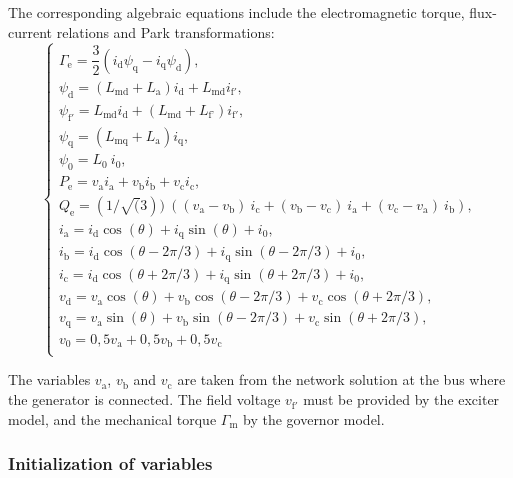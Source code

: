The corresponding algebraic equations include the electromagnetic torque, flux-current relations and Park transformations:
\begin{equation}
\begin{cases}
\Gamma_\text{e} = \dfrac{3}{2} (i_\text{d} \psi_\text{q} - i_\text{q} \psi_\text{d}), \\[6pt]
\psi_\text{d} = (L_{\text{md}} + L_\text{a}) i_\text{d} + L_{\text{md}} i_{\text{f}'}, \\[6pt]
\psi_{\text{f}'} = L_{\text{md}} i_\text{d} + (L_{\text{md}} + L_\text{f'}) i_{\text{f}'}, \\[6pt]
\psi_\text{q} = (L_{\text{mq}} + L_\text{a}) i_\text{q}, \\[6pt]
\psi_\text{0} = L_\text{0}~i_\text{0}, \\[6pt]
P_\text{e} = v_\text{a} i_\text{a} + v_\text{b} i_\text{b} + v_\text{c} i_\text{c}, \\[6pt]
Q_\text{e} = (1 / \sqrt(3))~ ((v_\text{a} - v_\text{b})~ i_\text{c} + (v_\text{b} - v_\text{c})~ i_\text{a} + (v_\text{c} - v_\text{a})~ i_\text{b}),\\[6pt]
i_\text{a} = i_\text{d} \cos(\theta)  + i_\text{q} \sin(\theta)  + i_\text{0}, \\[6pt]
i_\text{b} = i_\text{d} \cos(\theta - 2\pi/3)  + i_\text{q} \sin(\theta - 2\pi/3)  + i_\text{0}, \\[6pt]
i_\text{c} = i_\text{d} \cos(\theta + 2\pi/3)  + i_\text{q} \sin(\theta + 2\pi/3)  + i_\text{0}, \\[6pt]
v_\text{d} = v_\text{a} \cos(\theta) +  v_\text{b} \cos(\theta - 2\pi/3) + v_\text{c}\cos(\theta + 2\pi/3) , \\[6pt]
v_\text{q} = v_\text{a} \sin(\theta) + v_\text{b} \sin(\theta - 2\pi/3)  + v_\text{c} \sin(\theta + 2\pi/3) , \\[6pt]
v_\text{0} = 0,5 v_\text{a} + 0,5 v_\text{b} + 0,5 v_\text{c} \\[6pt]
\end{cases}
\label{eq:alg_eq_gen}
\end{equation}

The variables $v_\text{a}$, $v_\text{b}$ and $v_\text{c}$ are taken from the network solution at the bus where the generator is connected. 
The field voltage $v_{\text{f}'}$ must be provided by the exciter model, and the mechanical torque $\Gamma_\text{m}$ by the governor model.

\subsubsection{Initialization of variables}

